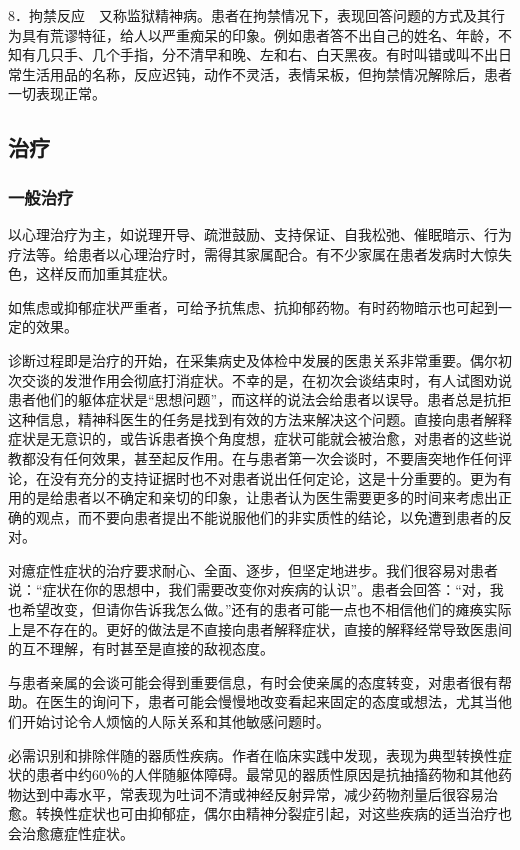 8．拘禁反应　又称监狱精神病。患者在拘禁情况下，表现回答问题的方式及其行为具有荒谬特征，给人以严重痴呆的印象。例如患者答不出自己的姓名、年龄，不知有几只手、几个手指，分不清早和晚、左和右、白天黑夜。有时叫错或叫不出日常生活用品的名称，反应迟钝，动作不灵活，表情呆板，但拘禁情况解除后，患者一切表现正常。

\subsection{治疗}

\subsubsection{一般治疗}

以心理治疗为主，如说理开导、疏泄鼓励、支持保证、自我松弛、催眠暗示、行为疗法等。给患者以心理治疗时，需得其家属配合。有不少家属在患者发病时大惊失色，这样反而加重其症状。

如焦虑或抑郁症状严重者，可给予抗焦虑、抗抑郁药物。有时药物暗示也可起到一定的效果。

诊断过程即是治疗的开始，在采集病史及体检中发展的医患关系非常重要。偶尔初次交谈的发泄作用会彻底打消症状。不幸的是，在初次会谈结束时，有人试图劝说患者他们的躯体症状是“思想问题”，而这样的说法会给患者以误导。患者总是抗拒这种信息，精神科医生的任务是找到有效的方法来解决这个问题。直接向患者解释症状是无意识的，或告诉患者换个角度想，症状可能就会被治愈，对患者的这些说教都没有任何效果，甚至起反作用。在与患者第一次会谈时，不要唐突地作任何评论，在没有充分的支持证据时也不对患者说出任何定论，这是十分重要的。更为有用的是给患者以不确定和亲切的印象，让患者认为医生需要更多的时间来考虑出正确的观点，而不要向患者提出不能说服他们的非实质性的结论，以免遭到患者的反对。

对癔症性症状的治疗要求耐心、全面、逐步，但坚定地进步。我们很容易对患者说：“症状在你的思想中，我们需要改变你对疾病的认识”。患者会回答：“对，我也希望改变，但请你告诉我怎么做。”还有的患者可能一点也不相信他们的瘫痪实际上是不存在的。更好的做法是不直接向患者解释症状，直接的解释经常导致医患间的互不理解，有时甚至是直接的敌视态度。

与患者亲属的会谈可能会得到重要信息，有时会使亲属的态度转变，对患者很有帮助。在医生的询问下，患者可能会慢慢地改变看起来固定的态度或想法，尤其当他们开始讨论令人烦恼的人际关系和其他敏感问题时。

必需识别和排除伴随的器质性疾病。作者在临床实践中发现，表现为典型转换性症状的患者中约60％的人伴随躯体障碍。最常见的器质性原因是抗抽搐药物和其他药物达到中毒水平，常表现为吐词不清或神经反射异常，减少药物剂量后很容易治愈。转换性症状也可由抑郁症，偶尔由精神分裂症引起，对这些疾病的适当治疗也会治愈癔症性症状。

